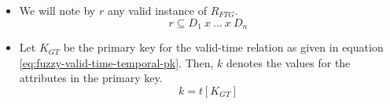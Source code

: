 \begin{definition}
\begin{itemize}
\item We will note by $r$ any valid instance of $R_{FTG}$. 
      \begin{equation}
       \label{eq:fuzzy-valid-time-instance}
      r \subseteq D_1\ x\ \ldots\ x\ D_n
      \end{equation}

% 
% 
% 
    \item Let $K_{GT}$ be the primary key for the valid-time relation as given in equation \eqref{eq:fuzzy-valid-time-temporal-pk}. Then, $k$ denotes the values for the attributes in the primary key.
	  \begin{equation}
	   \label{eq:fuzzy-value-pk}
	  k = t\left[K_{GT} \right]
	  \end{equation}
% 
% 
% 
\end{itemize}


\end{definition}
